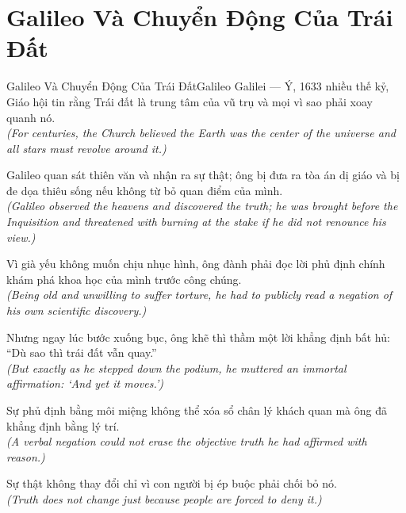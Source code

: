 \section{Galileo Và Chuyển Động Của Trái Đất}
\begin{truyen}{Galileo Và Chuyển Động Của Trái Đất}{Galileo Galilei --- Ý, 1633}
 nhiều thế kỷ, Giáo hội tin rằng Trái đất là trung tâm của vũ trụ và mọi vì sao phải xoay quanh nó.\\[4pt]
\textit{(For centuries, the Church believed the Earth was the center of the universe and all stars must revolve around it.)}

Galileo quan sát thiên văn và nhận ra sự thật; ông bị đưa ra tòa án dị giáo và bị đe dọa thiêu sống nếu không từ bỏ quan điểm của mình.\\[4pt]
\textit{(Galileo observed the heavens and discovered the truth; he was brought before the Inquisition and threatened with burning at the stake if he did not renounce his view.)}

Vì già yếu không muốn chịu nhục hình, ông đành phải đọc lời phủ định chính khám phá khoa học của mình trước công chúng.\\[4pt]
\textit{(Being old and unwilling to suffer torture, he had to publicly read a negation of his own scientific discovery.)}

Nhưng ngay lúc bước xuống bục, ông khẽ thì thầm một lời khẳng định bất hủ: ``Dù sao thì trái đất vẫn quay.''\\[4pt]
\textit{(But exactly as he stepped down the podium, he muttered an immortal affirmation: `And yet it moves.')}

Sự phủ định bằng môi miệng không thể xóa sổ chân lý khách quan mà ông đã khẳng định bằng lý trí.\\[4pt]
\textit{(A verbal negation could not erase the objective truth he had affirmed with reason.)}

\end{truyen}
\begin{baihoc}
  Sự thật không thay đổi chỉ vì con người bị ép buộc phải chối bỏ nó.\\[4pt]
  \textit{(Truth does not change just because people are forced to deny it.)}
\end{baihoc}

